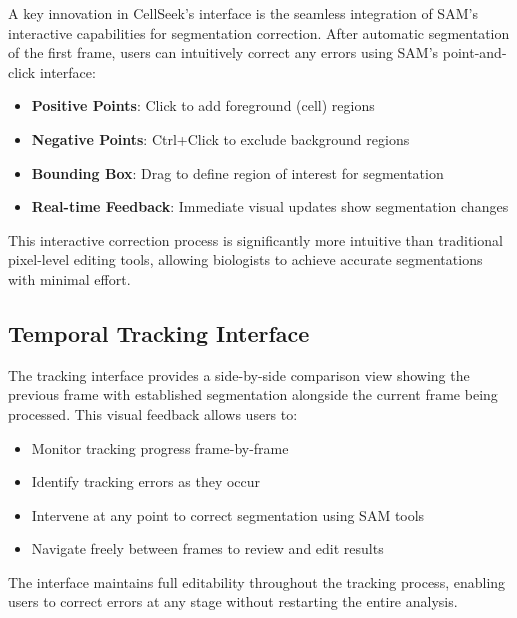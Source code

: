 \documentclass[../cellseek_paper.tex]{subfiles}
\begin{document}
A key innovation in CellSeek's interface is the seamless integration of SAM's interactive capabilities for segmentation correction. After automatic segmentation of the first frame, users can intuitively correct any errors using SAM's point-and-click interface:

\begin{itemize}
  \item \textbf{Positive Points}: Click to add foreground (cell) regions
  \item \textbf{Negative Points}: Ctrl+Click to exclude background regions
  \item \textbf{Bounding Box}: Drag to define region of interest for segmentation
  \item \textbf{Real-time Feedback}: Immediate visual updates show segmentation changes
\end{itemize}

This interactive correction process is significantly more intuitive than traditional pixel-level editing tools, allowing biologists to achieve accurate segmentations with minimal effort.

\subsection{Temporal Tracking Interface}

The tracking interface provides a side-by-side comparison view showing the previous frame with established segmentation alongside the current frame being processed. This visual feedback allows users to:

\begin{itemize}
  \item Monitor tracking progress frame-by-frame
  \item Identify tracking errors as they occur
  \item Intervene at any point to correct segmentation using SAM tools
  \item Navigate freely between frames to review and edit results
\end{itemize}

The interface maintains full editability throughout the tracking process, enabling users to correct errors at any stage without restarting the entire analysis.
\end{document}
